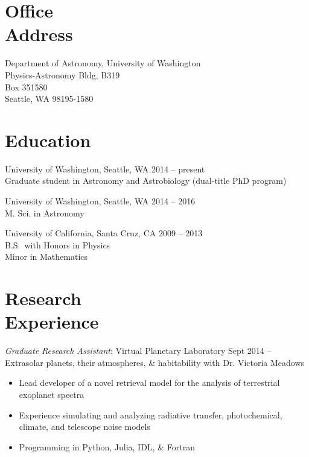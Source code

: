 \documentclass[margin,10pt]{res}
\begin{document}
\begin{resume}

\section{Office \\Address}
Department of Astronomy, University of Washington \\
Physics-Astronomy Bldg, B319 \\
Box 351580 \\
Seattle, WA 98195-1580 \\

\section{Education} 
University of Washington, Seattle, WA \hfill 2014 -- present\\
Graduate student in Astronomy and Astrobiology (dual-title PhD program)  

University of Washington, Seattle, WA \hfill 2014 -- 2016\\
M. Sci. in Astronomy

University of California, Santa Cruz, CA  \hfill 2009 -- 2013\\
B.S.\ with Honors in Physics \\
Minor in Mathematics\\

\section{Research \\Experience} 
                {\sl Graduate Research Assistant}: Virtual Planetary Laboratory   \hfill          Sept 2014 --\\
                Extrasolar planets, their atmospheres, \& habitability with Dr. Victoria Meadows
                    \begin{itemize}  \itemsep -1pt %
                        \item Lead developer of a novel retrieval model for the analysis of terrestrial exoplanet spectra 
                        \item Experience simulating and analyzing radiative transfer, photochemical, climate, and telescope noise models
                        \item Programming in Python, Julia, IDL, \& Fortran
                    \end{itemize}  


\end{resume}
\end{document}
